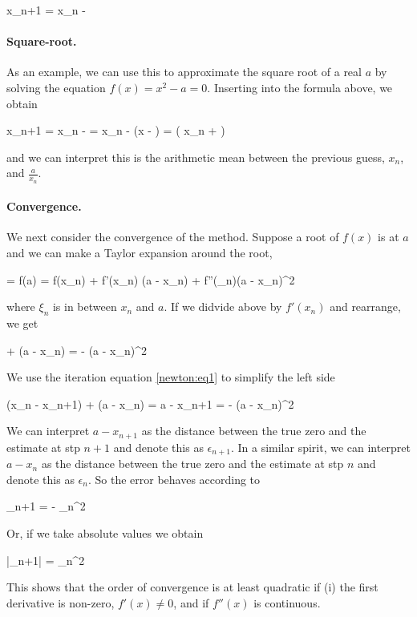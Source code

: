 \be\label{newton:eq1}
x_{n+1} = x_n - 
\ee

\paragraph{Square-root.} As an example, we can use this to approximate the square root of a real $a$ by solving the equation $f(x) = x^2 - a = 0$. Inserting into the formula above, we obtain

\bee
x_{n+1} = x_n -  = x_n - \left(x - \frac{a}{x]}\right) =  \left( x_n + \right)
\eee

and we can interpret this is the arithmetic mean between the previous guess, $x_n$, and $\frac{a}{x_n}$.

\paragraph{Convergence.} We next consider the convergence of the method. Suppose a root of $f(x)$ is at $a$ and we can make a Taylor expansion around the root,

 = f(a) = f(x_n) + f'(x_n) (a - x_n) + f''(\xi_n)(a - x_n)^2
\eee

where $\xi_n$ is in between $x_n$ and $a$. If we didvide above by $f'(x_n)$ and rearrange, we get

\bee
{} + (a - x_n) = - (a - x_n)^2
\eee

We use the iteration equation \eqref{newton:eq1} to simplify the left side

\bee
(x_n - x_{n+1}) + (a - x_n) = a - x_{n+1} = - (a - x_n)^2
\eee

We can interpret $a - x_{n+1}$ as the distance between the true zero and the estimate at stp $n+1$ and denote this as $\epsilon_{n+1}$. In a similar spirit, we can interpret $a - x_n$ as the distance between the true zero and the estimate at stp $n$ and denote this as $\epsilon_n$. So the error behaves according to

\bee
\epsilon_{n+1} = -  \epsilon_n^2
\eee

Or, if we take absolute values we obtain

\bee
|\epsilon_{n+1}| =  \epsilon_n^2
\eee

This shows that the order of convergence is at least quadratic if (i) the first derivative is non-zero, $f'(x) \neq 0$, and if $f''(x)$ is continuous.

